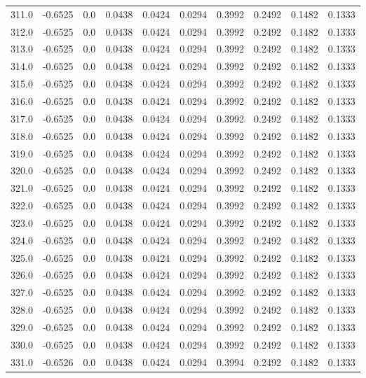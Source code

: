 \begin{longtable}{lrrrrrrrrr}
311.0 & -0.6525 & 0.0 & 0.0438 & 0.0424 & 0.0294 & 0.3992 & 0.2492 & 0.1482 & 0.1333 \\
312.0 & -0.6525 & 0.0 & 0.0438 & 0.0424 & 0.0294 & 0.3992 & 0.2492 & 0.1482 & 0.1333 \\
313.0 & -0.6525 & 0.0 & 0.0438 & 0.0424 & 0.0294 & 0.3992 & 0.2492 & 0.1482 & 0.1333 \\
314.0 & -0.6525 & 0.0 & 0.0438 & 0.0424 & 0.0294 & 0.3992 & 0.2492 & 0.1482 & 0.1333 \\
315.0 & -0.6525 & 0.0 & 0.0438 & 0.0424 & 0.0294 & 0.3992 & 0.2492 & 0.1482 & 0.1333 \\
316.0 & -0.6525 & 0.0 & 0.0438 & 0.0424 & 0.0294 & 0.3992 & 0.2492 & 0.1482 & 0.1333 \\
317.0 & -0.6525 & 0.0 & 0.0438 & 0.0424 & 0.0294 & 0.3992 & 0.2492 & 0.1482 & 0.1333 \\
318.0 & -0.6525 & 0.0 & 0.0438 & 0.0424 & 0.0294 & 0.3992 & 0.2492 & 0.1482 & 0.1333 \\
319.0 & -0.6525 & 0.0 & 0.0438 & 0.0424 & 0.0294 & 0.3992 & 0.2492 & 0.1482 & 0.1333 \\
320.0 & -0.6525 & 0.0 & 0.0438 & 0.0424 & 0.0294 & 0.3992 & 0.2492 & 0.1482 & 0.1333 \\
321.0 & -0.6525 & 0.0 & 0.0438 & 0.0424 & 0.0294 & 0.3992 & 0.2492 & 0.1482 & 0.1333 \\
322.0 & -0.6525 & 0.0 & 0.0438 & 0.0424 & 0.0294 & 0.3992 & 0.2492 & 0.1482 & 0.1333 \\
323.0 & -0.6525 & 0.0 & 0.0438 & 0.0424 & 0.0294 & 0.3992 & 0.2492 & 0.1482 & 0.1333 \\
324.0 & -0.6525 & 0.0 & 0.0438 & 0.0424 & 0.0294 & 0.3992 & 0.2492 & 0.1482 & 0.1333 \\
325.0 & -0.6525 & 0.0 & 0.0438 & 0.0424 & 0.0294 & 0.3992 & 0.2492 & 0.1482 & 0.1333 \\
326.0 & -0.6525 & 0.0 & 0.0438 & 0.0424 & 0.0294 & 0.3992 & 0.2492 & 0.1482 & 0.1333 \\
327.0 & -0.6525 & 0.0 & 0.0438 & 0.0424 & 0.0294 & 0.3992 & 0.2492 & 0.1482 & 0.1333 \\
328.0 & -0.6525 & 0.0 & 0.0438 & 0.0424 & 0.0294 & 0.3992 & 0.2492 & 0.1482 & 0.1333 \\
329.0 & -0.6525 & 0.0 & 0.0438 & 0.0424 & 0.0294 & 0.3992 & 0.2492 & 0.1482 & 0.1333 \\
330.0 & -0.6525 & 0.0 & 0.0438 & 0.0424 & 0.0294 & 0.3992 & 0.2492 & 0.1482 & 0.1333 \\
331.0 & -0.6526 & 0.0 & 0.0438 & 0.0424 & 0.0294 & 0.3994 & 0.2492 & 0.1482 & 0.1333 \\

\end{longtable}
